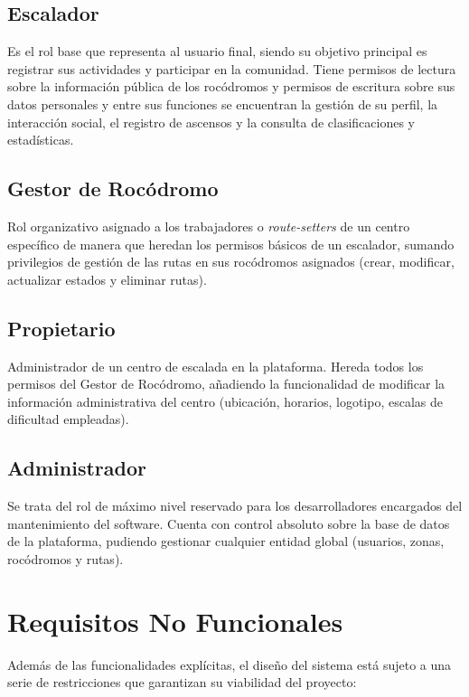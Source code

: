 \subsection{Escalador}
Es el rol base que representa al usuario final, siendo su objetivo principal es registrar sus actividades y participar en la comunidad. Tiene permisos de lectura sobre la información pública de los rocódromos y permisos de escritura sobre sus datos personales y entre sus funciones se encuentran la gestión de su perfil, la interacción social, el registro de ascensos y la consulta de clasificaciones y estadísticas.

\subsection{Gestor de Rocódromo}
Rol organizativo asignado a los trabajadores o \textit{route-setters} de un centro específico de manera que heredan los permisos básicos de un escalador, sumando privilegios de gestión de las rutas en sus rocódromos asignados (crear, modificar, actualizar estados y eliminar rutas).

\subsection{Propietario}
Administrador de un centro de escalada en la plataforma. Hereda todos los permisos del Gestor de Rocódromo, añadiendo la funcionalidad de modificar la información administrativa del centro (ubicación, horarios, logotipo, escalas de dificultad empleadas).

\subsection{Administrador}
Se trata del rol de máximo nivel reservado para los desarrolladores encargados del mantenimiento del software. Cuenta con control absoluto sobre la base de datos de la plataforma, pudiendo gestionar cualquier entidad global (usuarios, zonas, rocódromos y rutas).

\section{Requisitos No Funcionales}

Además de las funcionalidades explícitas, el diseño del sistema está sujeto a una serie de restricciones que garantizan su viabilidad del proyecto:

